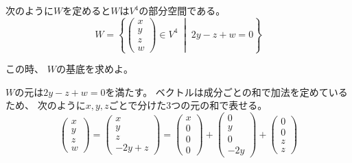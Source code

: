 \documentclass[12pt,b5paper]{ltjsarticle}
\begin{document}
次のように$W$を定めると$W$は$V^{4}$の部分空間である。
\begin{equation}
 W=
  \left\{
   \begin{pmatrix} x\\y\\z\\w \end{pmatrix} \in V^{4}
   \; \middle| \; 2y-z+w=0
  \right\}
\end{equation}

この時、
$W$の基底を求めよ。

\hrulefill

$W$の元は$2y-z+w=0$を満たす。
ベクトルは成分ごとの和で加法を定めているため、
次のように$x,y,z$ごとで分けた3つの元の和で表せる。
\begin{equation}
 \begin{pmatrix} x\\y\\z\\w \end{pmatrix}
 = \begin{pmatrix} x\\y\\z\\-2y+z \end{pmatrix}
 = \begin{pmatrix} x\\0\\0\\0 \end{pmatrix}
 + \begin{pmatrix} 0\\y\\0\\-2y \end{pmatrix}
 + \begin{pmatrix} 0\\0\\z\\z \end{pmatrix}
\end{equation}
\end{document}

